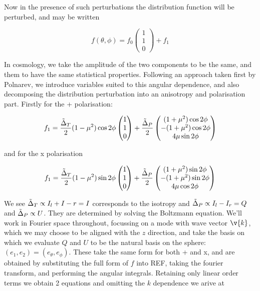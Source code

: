 Now in the presence of such perturbations the distribution function will be perturbed, and may be written

\begin{equation}
f(\theta,\phi) = f_0 \begin{pmatrix}
1\\
1\\
0
\end{pmatrix} + f_1
\end{equation}

In cosmology, we take the amplitude of the two components to be the same, and them to have the same statistical properties. Following an approach taken first by Polnarev, we introduce variables suited to this angular dependence, and also decomposing the distribution perturbation into an anisotropy and polarisation part. Firstly for the + polarisation:

\begin{equation}
f_1 = \frac{\Tilde{\Delta}_T}{2}(1-\mu^2)\cos{2\phi}\begin{pmatrix}1\\1\\0\end{pmatrix} + \frac{\Tilde{\Delta}_P}{2}\begin{pmatrix}(1+\mu^2)\cos{2\phi}\\-(1+\mu^2)\cos{2\phi}\\4\mu\sin{2\phi}\end{pmatrix}
\end{equation}

and for the x polarisation

\begin{equation}
f_1 = \frac{\Tilde{\Delta}_T}{2}(1-\mu^2)\sin{2\phi}\begin{pmatrix}1\\1\\0\end{pmatrix} + \frac{\Tilde{\Delta}_P}{2}\begin{pmatrix}(1+\mu^2)\sin{2\phi}\\-(1+\mu^2)\sin{2\phi}\\4\mu\cos{2\phi}\end{pmatrix}
\end{equation}

We see $\Tilde{\Delta}_T \propto I_l+I-r = I$ corresponds to the isotropy and $\Tilde{\Delta}_P \propto I_l - I_r = Q$ and $\Tilde{\Delta}_P \propto U$. They are determined by solving the Boltzmann equation. We'll work in Fourier space throughout, focussing on a mode with wave vector $\v{k}$, which we may choose to be aligned with the $\unit{z}$ direction, and take the basis on which we evaluate $Q$ and $U$ to be the natural basis on the sphere: $(\unit{e_1}, \unit{e_2}) = (\unit{e_\theta}, \unit{e_\phi})$. These take the same form for both + and x, and are obtained by substituting the full form of $f$ into REF, taking the fourier transform, and performing the angular integrals. Retaining only linear order terms we obtain 2 equations and omitting the $k$ dependence we arive at 

